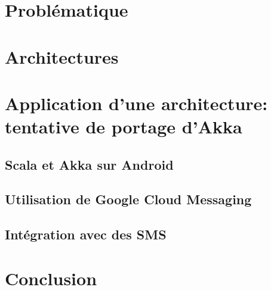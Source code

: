 \documentclass[a4paper,12pt]{article}
\begin{document}
\fancyhead[L]{\leftmark}

\section{Problématique}
\section{Architectures}
\section{Application d'une architecture: tentative de portage d'Akka}
\subsection{Scala et Akka sur Android}
\subsection{Utilisation de Google Cloud Messaging}
\subsection{Intégration avec des SMS}
\newpage


\section*{Conclusion}
\end{document}
